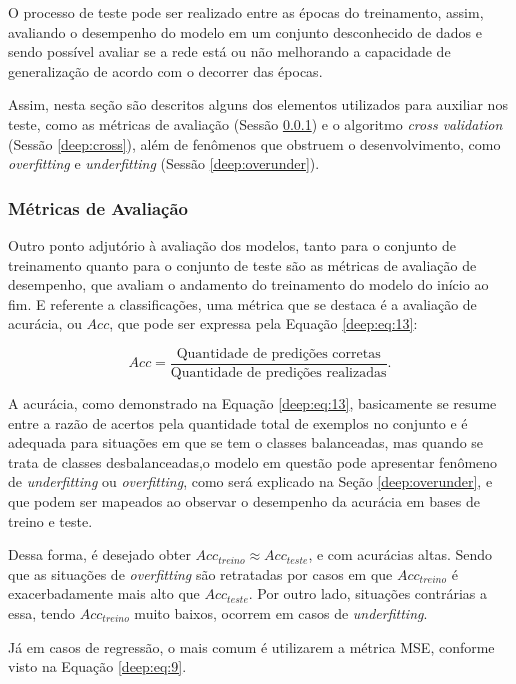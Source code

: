 O processo de teste pode ser realizado entre as épocas do treinamento, assim, avaliando o desempenho do modelo em um conjunto desconhecido de dados e sendo possível avaliar se a rede está ou não melhorando a capacidade de generalização de acordo com o decorrer das épocas.

Assim, nesta seção são descritos alguns dos elementos utilizados para auxiliar nos teste, como as métricas de avaliação (Sessão \ref{deep:metrics}) e o algoritmo \textit{cross validation} (Sessão \ref{deep:cross}), além de fenômenos que obstruem o desenvolvimento, como \textit{overfitting} e \textit{underfitting} (Sessão \ref{deep:overunder}).


\subsubsection{Métricas de Avaliação}
\label{deep:metrics}

Outro ponto adjutório à avaliação dos modelos, tanto para o conjunto de treinamento quanto para o conjunto de teste são as métricas de avaliação de desempenho, que avaliam o andamento do treinamento do modelo do início ao fim. E referente a classificações, uma métrica que se destaca é a avaliação de acurácia, ou $Acc$, que pode ser expressa pela Equação \ref{deep:eq:13}:

\begin{equation}
    \label{deep:eq:13}
    Acc = \frac{\text{Quantidade de predições corretas}}{\text{Quantidade de predições realizadas}}.
\end{equation}

A acurácia, como demonstrado na Equação \ref{deep:eq:13}, basicamente se resume entre a razão de acertos pela quantidade total de exemplos no conjunto e é adequada para situações em que se tem o classes balanceadas, mas quando se trata de classes desbalanceadas,o modelo em questão pode apresentar fenômeno de \textit{underfitting} ou \textit{overfitting}, como será explicado na Seção \ref{deep:overunder}, e que podem ser mapeados ao observar o desempenho da acurácia em bases de treino e teste.

Dessa forma, é desejado obter $Acc_{treino} \approx Acc_{teste}$, e com  acurácias altas. Sendo que as situações de \textit{overfitting} são retratadas por casos em que $Acc_{treino}$ é exacerbadamente mais alto que $Acc_{teste}$. Por outro lado, situações contrárias a essa, tendo $Acc_{treino}$ muito baixos, ocorrem em casos de \textit{underfitting}.

Já em casos de regressão, o mais comum é utilizarem a métrica MSE, conforme visto na Equação \ref{deep:eq:9}.


